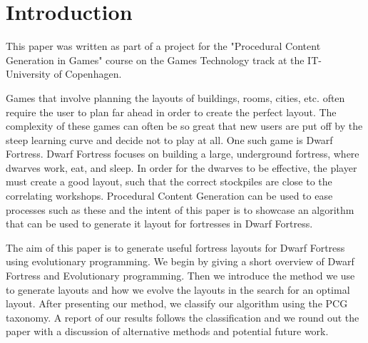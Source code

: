\section{Introduction}
\label{01}
This paper was written as part of a project for the "Procedural Content Generation in Games" course on the Games Technology track at the IT-University of Copenhagen.

Games that involve planning the layouts of buildings, rooms, cities, etc. often require the user to plan far ahead in order to create the perfect layout. The complexity of these games can often be so great that new users are put off by the steep learning curve and decide not to play at all. One such game is Dwarf Fortress\cite{DwarfFortress}. Dwarf Fortress focuses on building a large, underground fortress, where dwarves work, eat, and sleep. In order for the dwarves to be effective, the player must create a good layout, such that the correct stockpiles are close to the correlating workshops. Procedural Content Generation can be used to ease processes such as these and the intent of this paper is to showcase an algorithm that can be used to generate it layout for fortresses in Dwarf Fortress.

The aim of this paper is to generate useful fortress layouts for Dwarf Fortress using evolutionary programming. We begin by giving a short overview of Dwarf Fortress and Evolutionary programming. Then we introduce the method we use to generate layouts and how we evolve the layouts in the search for an optimal layout. After presenting our method, we classify our algorithm using the PCG taxonomy\cite{togelius2010search}. A report of our results follows the classification and we round out the paper with a discussion of alternative methods and potential future work.
